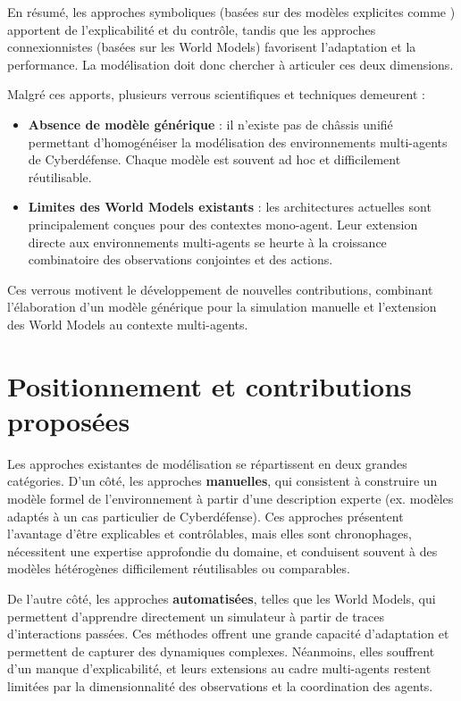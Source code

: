 En résumé, les approches symboliques (basées sur des modèles explicites comme \phantom{XXXX} ) apportent de l'explicabilité et du contrôle, tandis que les approches connexionnistes (basées sur les World Models) favorisent l'adaptation et la performance.
La modélisation doit donc chercher à articuler ces deux dimensions.

Malgré ces apports, plusieurs verrous scientifiques et techniques demeurent :
\begin{itemize}
  \item \textbf{Absence de modèle générique} : il n'existe pas de châssis unifié permettant d'homogénéiser la modélisation des environnements multi-agents de Cyberdéfense. Chaque modèle est souvent ad hoc et difficilement réutilisable.
  \item \textbf{Limites des World Models existants} : les architectures actuelles sont principalement conçues pour des contextes mono-agent. Leur extension directe aux environnements multi-agents se heurte à la croissance combinatoire des observations conjointes et des actions.
\end{itemize}

Ces verrous motivent le développement de nouvelles contributions, combinant l'élaboration d'un modèle générique pour la simulation manuelle et l'extension des World Models au contexte multi-agents.

\section{Positionnement et contributions proposées}

Les approches existantes de modélisation se répartissent en deux grandes catégories.
D'un côté, les approches \textbf{manuelles}, qui consistent à construire un modèle formel de l'environnement à partir d'une description experte (ex. modèles  adaptés à un cas particulier de Cyberdéfense). Ces approches présentent l'avantage d'être explicables et contrôlables, mais elles sont chronophages, nécessitent une expertise approfondie du domaine, et conduisent souvent à des modèles hétérogènes difficilement réutilisables ou comparables.

De l'autre côté, les approches \textbf{automatisées}, telles que les World Models, qui permettent d'apprendre directement un simulateur à partir de traces d'interactions passées. Ces méthodes offrent une grande capacité d'adaptation et permettent de capturer des dynamiques complexes. Néanmoins, elles souffrent d'un manque d'explicabilité, et leurs extensions au cadre multi-agents restent limitées par la dimensionnalité des observations et la coordination des agents.

